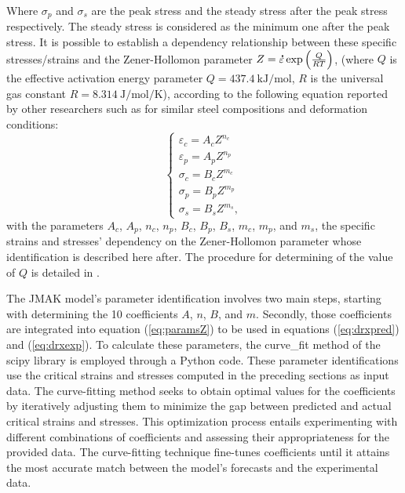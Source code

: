 \documentclass[metals,article,submit,pdftex,moreauthors]{Definitions/mdpi}
\DeclareRobustCommand{\mdot}[1]{\accentset{\mbox{\bfseries .}}{#1}}
\begin{document}
Where $\sigma_p$ and $\sigma_s$ are the peak stress and the steady stress after the peak stress respectively.
The steady stress is considered as the minimum one after the peak stress.
It is possible to establish a dependency relationship between these specific stresses/strains and the Zener-Hollomon \cite{Zenner-1944} parameter $Z = \mdot\varepsilon \exp{\left(\frac{Q}{RT}\right)} \label{eq:ArZ}$, (where $Q$ is the effective activation energy parameter $Q=437.4~\text{kJ/mol}$, $R$ is the universal gas constant $R=8.314~\text{J/mol/K}$), according to the following equation reported by other researchers such as \cite{Chen-2014,Li-2019,Wang-2021} for similar steel compositions and deformation conditions:
\begin{equation}
\begin{cases}
\varepsilon_c = A_cZ^{n_c} \\ \varepsilon_p = A_pZ^{n_p} \\ \sigma_c = B_cZ^{m_c} \\ \sigma_p = B_pZ^{m_p}\\ \sigma_s = B_sZ^{m_s},
\end{cases}
\label{eq:paramsZ}
\end{equation}
with the parameters $A_c$, $A_p$, $n_c$, $n_p$, $B_c$, $B_p$, $B_s$, $m_c$, $m_p$, and $m_s$, the specific strains and stresses' dependency on the Zener-Hollomon parameter whose identification is described here after.
The procedure for determining of the value of $Q$ is detailed in \cite{TizeMha-2023}.

The JMAK model's parameter identification involves two main steps, starting with determining the 10 coefficients $A$, $n$, $B$, and $m$.
Secondly, those coefficients are integrated into equation (\ref{eq:paramsZ}) to be used in equations (\ref{eq:drxpred}) and (\ref{eq:drxexp}).
To calculate these parameters, the curve\_fit method of the scipy library is employed through a Python code.
These parameter identifications use the critical strains and stresses computed in the preceding sections as input data.
The curve-fitting method seeks to obtain optimal values for the coefficients by iteratively adjusting them to minimize the gap between predicted and actual critical strains and stresses.
This optimization process entails experimenting with different combinations of coefficients and assessing their appropriateness for the provided data.
The curve-fitting technique fine-tunes coefficients until it attains the most accurate match between the model's forecasts and the experimental data.
\end{document}
